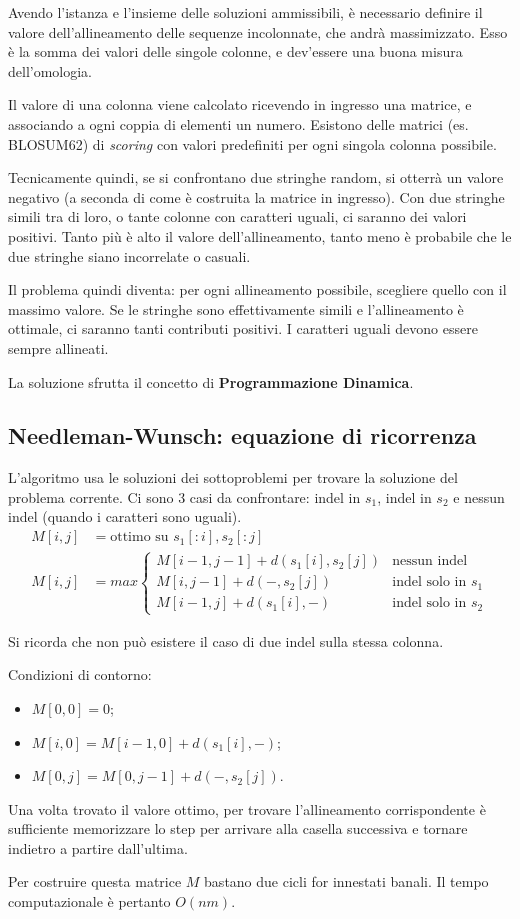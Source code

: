 Avendo l'istanza e l'insieme delle soluzioni ammissibili, è necessario definire il valore dell'allineamento delle sequenze incolonnate, che andrà massimizzato. Esso è la somma dei valori delle singole colonne, e dev'essere una buona misura dell'omologia.

Il valore di una colonna viene calcolato ricevendo in ingresso una matrice, e associando a ogni coppia di elementi un numero. Esistono delle matrici (es. BLOSUM62) di \textit{scoring} con valori predefiniti per ogni singola colonna possibile.

Tecnicamente quindi, se si confrontano due stringhe random, si otterrà un valore negativo (a seconda di come è costruita la matrice in ingresso). Con due stringhe simili tra di loro, o tante colonne con caratteri uguali, ci saranno dei valori positivi. Tanto più è alto il valore dell'allineamento, tanto meno è probabile che le due stringhe siano incorrelate o casuali.

Il problema quindi diventa: per ogni allineamento possibile, scegliere quello con il massimo valore. Se le stringhe sono effettivamente simili e l'allineamento è ottimale, ci saranno tanti contributi positivi. I caratteri uguali devono essere sempre allineati.

La soluzione sfrutta il concetto di \textbf{Programmazione Dinamica}.

\newpage
\subsection{Needleman-Wunsch: equazione di ricorrenza}
L'algoritmo usa le soluzioni dei sottoproblemi per trovare la soluzione del problema corrente. Ci sono 3 casi da confrontare: indel in $s_1$, indel in $s_2$ e nessun indel (quando i caratteri sono uguali). 
\begin{align*}
    M[i, j] &= \text{ottimo su } s_1[:i], s_2[:j] \\
    M[i, j] &= max \begin{cases}
        M[i - 1, j - 1] + d(s_1[i], s_2[j]) & \text{nessun indel} \\
        M[i, j - 1] + d(-, s_2[j]) & \text{indel solo in $s_1$} \\
        M[i - 1, j] + d(s_1[i], -) & \text{indel solo in $s_2$}
    \end{cases}
\end{align*}

Si ricorda che non può esistere il caso di due indel sulla stessa colonna.

Condizioni di contorno: \begin{itemize}
    \item $M[0, 0] = 0$;
    \item $M[i, 0] = M[i - 1, 0] + d(s_1[i], -)$;
    \item $M[0, j] = M[0, j - 1] + d(-, s_2[j])$.
\end{itemize}

Una volta trovato il valore ottimo, per trovare l'allineamento corrispondente è sufficiente memorizzare lo step per arrivare alla casella successiva e tornare indietro a partire dall'ultima.

Per costruire questa matrice $M$ bastano due cicli for innestati banali. Il tempo computazionale è pertanto $O(nm)$. 
